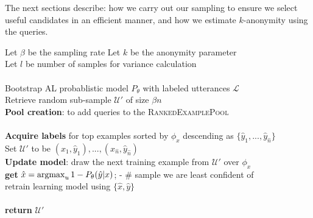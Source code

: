 \documentclass[letterpaper]{article}
\newcommand{\argmax}{\operatornamewithlimits{argmax}}
\begin{document}
The next sections describe: how we carry out our sampling to ensure we select useful candidates in an efficient manner, and how we estimate $k$-anonymity using the queries.



\LinesNumbered
\begin{algorithm}[t]
Let $\beta$ be the sampling rate 
Let $k$ be the anonymity parameter \\
Let $l$ be number of samples for variance calculation \\
\hfill \\

Bootstrap \textsc{AL} probablistic model $P_\theta$ with labeled utterances $\mathcal{L}$\\
Retrieve random sub-sample $\mathcal{U}'$ of size $\beta n$\\

\textbf{Pool creation}: to add queries to the \textsc{RankedExamplePool}\\
\hfill \\

\textbf{Acquire labels} for top examples sorted by $\phi_x$ descending as $\{\hat{y}_1,...,\hat{y}_{\hat{n}}\}$ \\
Set $\mathcal{U}'$ to be $(x_1,\hat{y}_1),...,(x_{\hat{n}},\hat{y}_{\hat{n}})$ \\
  \textbf{Update model}: draw the next training example from $\mathcal{U}'$ over $\phi_x$\\
\hspace{0.4cm} \textbf{get} $\hat{x} = \argmax_u 1 - P_\theta(\hat{y}|x)$; - \# sample we are least confident of \\
\hspace{0.4cm} retrain learning model using $\{\hat{x},\hat{y}\}$\\

\hfill \\
\textbf{return} $\mathcal{U}'$
 \caption{Privacy-preserving Active Learning}
\end{algorithm}
\end{document}
